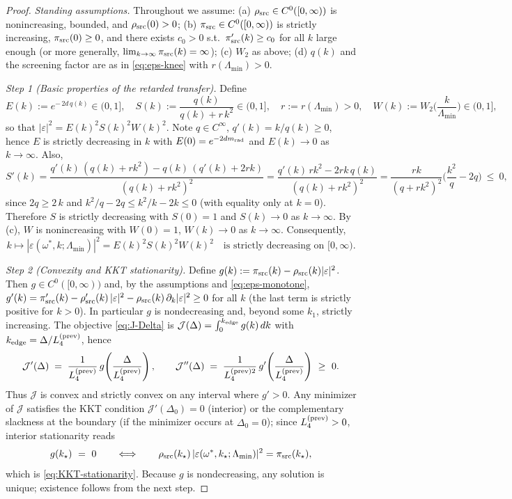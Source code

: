 \documentclass[10pt]{article}
\theoremstyle{definition}
\theoremstyle{plain}
\begin{document}
\begin{proof}
\emph{Standing assumptions.} Throughout we assume:
(a) $\rho_{\rm src}\in C^0([0,\infty))$ is nonincreasing, bounded, and $\rho_{\rm src}(0)>0$;
(b) $\pi_{\rm src}\in C^0([0,\infty))$ is strictly increasing, $\pi_{\rm src}(0)\ge 0$, and
there exists $c_0>0$ s.t.\ $\pi_{\rm src}'(k)\ge c_0$ for all $k$ large enough (or more generally, $\lim_{k\to\infty}\pi_{\rm src}(k)=\infty$);
(c) $W_2$ as above; (d) $q(k)$ and the screening factor are as in \eqref{eq:eps-knee} with $r(\Lambda_{\min})>0$.

\smallskip
\noindent\emph{Step 1 (Basic properties of the retarded transfer).}
Define
\[
E(k):=e^{-\,2d\,q(k)}\in(0,1],\quad S(k):=\frac{q(k)}{q(k)+r\,k^2}\in(0,1],\quad r:=r(\Lambda_{\min})>0,\quad W(k):=W_2\!\Big(\frac{k}{\Lambda_{\min}}\Big)\in(0,1],
\]
so that $|\varepsilon|^2=E(k)^2 S(k)^2 W(k)^2$. Note $q\in C^\infty$, $q'(k)=k/q(k)\ge 0$, hence $E$ is strictly
decreasing in $k$ with $E(0)=e^{-2d m_{\rm rad}}$ and $E(k)\to 0$ as $k\to\infty$. Also,
\begin{equation}\label{eq:S-derivative}
S'(k)=\frac{q'(k)\,(q(k)+rk^2)-q(k)\,(q'(k)+2rk)}{(q(k)+rk^2)^2}
=\frac{q'(k)\,rk^2 - 2rk\,q(k)}{(q(k)+rk^2)^2}
=\frac{rk}{(q+rk^2)^2}\Big(\frac{k^2}{q}-2q\Big)\ \le\ 0,
\end{equation}
since $2q\ge 2\,k$ and $k^2/q - 2q \le k^2/k - 2k\le 0$ (with equality only at $k=0$). Therefore $S$ is
strictly decreasing with $S(0)=1$ and $S(k)\to 0$ as $k\to\infty$. By (c), $W$ is nonincreasing with $W(0)=1$,
$W(k)\to 0$ as $k\to\infty$. Consequently,
\begin{equation}\label{eq:eps-monotone}
k\mapsto |\varepsilon(\omega^{*},k;\Lambda_{\min})|^2=E(k)^2 S(k)^2 W(k)^2\quad\text{is strictly decreasing on }[0,\infty).
\end{equation}

\smallskip
\noindent\emph{Step 2 (Convexity and KKT stationarity).}
Define $g(k):=\pi_{\rm src}(k)-\rho_{\rm src}(k)|\varepsilon|^2$. Then $g\in C^0([0,\infty))$ and, by the assumptions and
\eqref{eq:eps-monotone}, $g'(k)=\pi_{\rm src}'(k)-\rho_{\rm src}'(k)\,|\varepsilon|^2 - \rho_{\rm src}(k)\,\partial_k|\varepsilon|^2\ge 0$
for all $k$ (the last term is strictly positive for $k>0$). In particular $g$ is nondecreasing and, beyond some $k_1$,
strictly increasing. The objective \eqref{eq:J-Delta} is $\mathcal J(\Delta)=\int_0^{k_{\rm edge}} g(k)\,dk$ with $k_{\rm edge}=\Delta/L_4^{\rm(prev)}$, hence
\[
\mathcal J'(\Delta)\;=\;\frac{1}{L_4^{\rm(prev)}}\,g\!\left(\frac{\Delta}{L_4^{\rm(prev)}}\right),\qquad
\mathcal J''(\Delta)\;=\;\frac{1}{L_4^{\rm(prev)2}}\,g'\!\left(\frac{\Delta}{L_4^{\rm(prev)}}\right)\ \ge\ 0.
\]
Thus $\mathcal J$ is convex and strictly convex on any interval where $g'>0$. Any minimizer of $\mathcal J$ satisfies the KKT condition $\mathcal J'(\Delta_0)=0$ (interior) or the complementary slackness at the boundary (if the minimizer occurs at $\Delta_0=0$); since $L_4^{\rm(prev)}>0$, interior stationarity reads
\[
g(k_\star)\ =\ 0\qquad\Longleftrightarrow\qquad \rho_{\rm src}(k_\star)\,|\varepsilon(\omega^{*},k_\star;\Lambda_{\min})|^2=\pi_{\rm src}(k_\star),
\]
which is \eqref{eq:KKT-stationarity}. Because $g$ is nondecreasing, any solution is unique; existence follows from the next step.


\end{proof}
\end{document}
